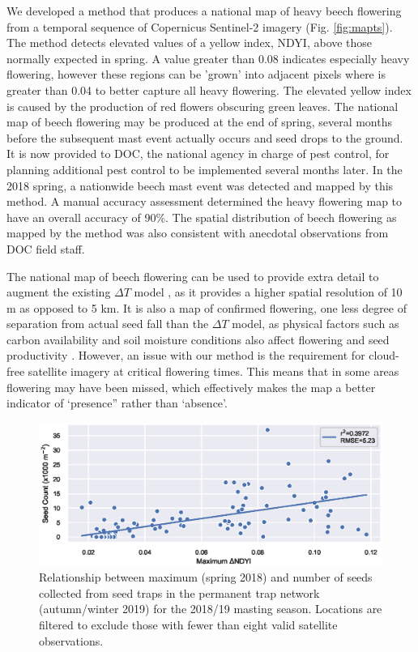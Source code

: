 \documentclass[remotesensing,article,submit,moreauthors,pdftex]{Definitions/mdpi}
\begin{document}
We developed a method that produces a national map of heavy beech flowering from a temporal sequence of Copernicus Sentinel-2 imagery (Fig. \ref{fig:mapts}). The method detects elevated values of a yellow index, NDYI, above those normally expected in spring. A \dndyi{} value greater than 0.08 indicates especially heavy flowering, however these regions can be 'grown' into adjacent pixels where \dndyi{} is greater than 0.04 to better capture all heavy flowering. The elevated yellow index is caused by the production of red flowers obscuring green leaves. The national map of beech flowering may be produced at the end of spring, several months before the subsequent mast event actually occurs and seed drops to the ground. It is now provided to DOC, the national agency in charge of pest control, for planning additional pest control to be implemented several months later. In the 2018 spring, a nationwide beech mast event was detected and mapped by this method. A manual accuracy assessment determined the heavy flowering map to have an overall accuracy of  90\%. The spatial distribution of beech flowering as mapped by the method was also consistent with anecdotal observations from DOC field staff.

The national map of beech flowering can be used to provide extra detail to augment the existing $\Delta{T}$ model \citep{Kelly2013}, as it provides a higher spatial resolution of 10 m as opposed to 5 km. It is also a map of confirmed flowering, one less degree of separation from actual seed fall than the $\Delta{T}$ model, as physical factors such as carbon availability and soil moisture conditions also affect flowering and seed productivity \citep{Uscoe2005}. However, an issue with our method is the requirement for cloud-free satellite imagery at critical flowering times. This means that in some areas flowering may have been missed, which effectively makes the map a better indicator of ‘presence” rather than ‘absence’. 

\begin{figure}
    \centering
    \includegraphics[width=\textwidth]{images/figure5_scatter_ndyi_seed_2018-2019.eps}
    \caption{Relationship between maximum \dndyi{} (spring 2018) and number of seeds collected from seed traps in the permanent trap network (autumn/winter 2019) for the 2018/19 masting season. Locations are filtered to exclude those with fewer than eight valid satellite observations.}
    \label{fig:trayscatter1819}
\end{figure}   
\end{document}
